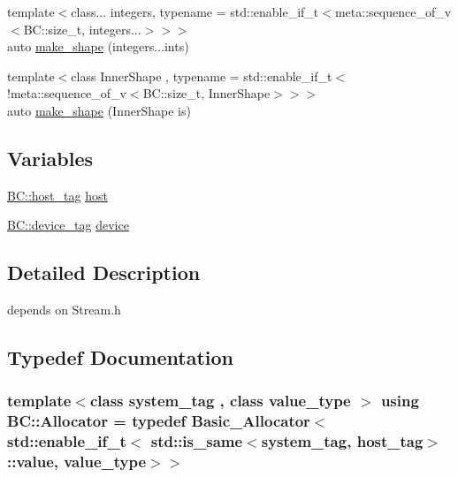 \begin{DoxyCompactItemize}
\item 
{\footnotesize template$<$class... integers, typename  = std\+::enable\+\_\+if\+\_\+t$<$meta\+::sequence\+\_\+of\+\_\+v$<$\+B\+C\+::size\+\_\+t, integers...$>$$>$$>$ }\\auto \hyperlink{namespaceBC_a4ca5e2fe2bd2f884441847cdfd953de8}{make\+\_\+shape} (integers...\+ints)
\item 
{\footnotesize template$<$class Inner\+Shape , typename  = std\+::enable\+\_\+if\+\_\+t$<$!meta\+::sequence\+\_\+of\+\_\+v$<$\+B\+C\+::size\+\_\+t, Inner\+Shape$>$$>$$>$ }\\auto \hyperlink{namespaceBC_a267b352d08fd2323ae638bf7d7bf0d23}{make\+\_\+shape} (Inner\+Shape is)
\end{DoxyCompactItemize}
\subsection*{Variables}
\begin{DoxyCompactItemize}
\item 
\hyperlink{structBC_1_1host__tag}{B\+C\+::host\+\_\+tag} \hyperlink{namespaceBC_a6a08f6f3615e3b1abd0460c74c899536}{host}
\item 
\hyperlink{structBC_1_1device__tag}{B\+C\+::device\+\_\+tag} \hyperlink{namespaceBC_a7e470be15628f2bc146897a23005c9b9}{device}
\end{DoxyCompactItemize}


\subsection{Detailed Description}
depends on Stream.\+h 

\subsection{Typedef Documentation}
\subsubsection[{\texorpdfstring{Allocator}{Allocator}}]{\setlength{\rightskip}{0pt plus 5cm}template$<$class system\+\_\+tag , class value\+\_\+type $>$ using {\bf B\+C\+::\+Allocator} = typedef {\bf Basic\+\_\+\+Allocator}$<$ std\+::enable\+\_\+if\+\_\+t$<$ std\+::is\+\_\+same$<$system\+\_\+tag, {\bf host\+\_\+tag}$>$\+::value, value\+\_\+type$>$$>$}\hypertarget{namespaceBC_a934f94b17b06290e6b241e5f59930c5f}{}\label{namespaceBC_a934f94b17b06290e6b241e5f59930c5f}
